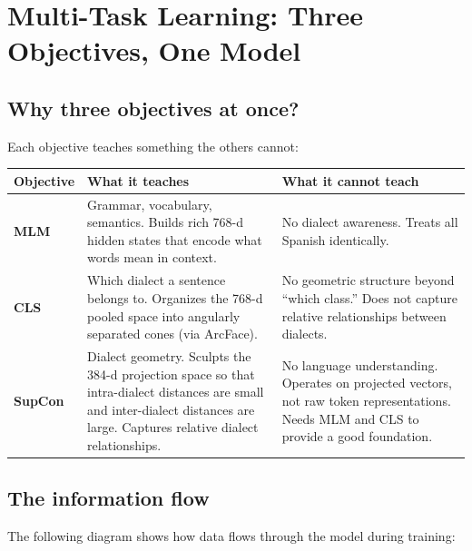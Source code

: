 \documentclass[11pt,a4paper]{article}
\theoremstyle{definition}
\begin{document}
\section{Multi-Task Learning: Three Objectives, One Model}
\label{sec:multitask}

\subsection{Why three objectives at once?}

Each objective teaches something the others cannot:

\begin{center}
\renewcommand{\arraystretch}{1.4}
\begin{tabular}{>{\bfseries}l p{5cm} p{5cm}}
\toprule
\textbf{Objective} & \textbf{What it teaches} & \textbf{What it cannot teach} \\
\midrule
\textcolor{mlmcolor}{MLM} &
  Grammar, vocabulary, semantics. Builds rich 768-d hidden states
  that encode what words mean in context. &
  No dialect awareness. Treats all Spanish identically. \\
\textcolor{clscolor}{CLS} &
  Which dialect a sentence belongs to. Organizes the 768-d pooled
  space into angularly separated cones (via ArcFace). &
  No geometric structure beyond ``which class.'' Does not capture
  relative relationships between dialects. \\
\textcolor{concolor}{SupCon} &
  Dialect geometry. Sculpts the 384-d projection space so that
  intra-dialect distances are small and inter-dialect distances are
  large. Captures relative dialect relationships. &
  No language understanding. Operates on projected vectors, not raw
  token representations. Needs MLM and CLS to provide a good
  foundation. \\
\bottomrule
\end{tabular}
\end{center}

\subsection{The information flow}

The following diagram shows how data flows through the model during
training:
\end{document}
